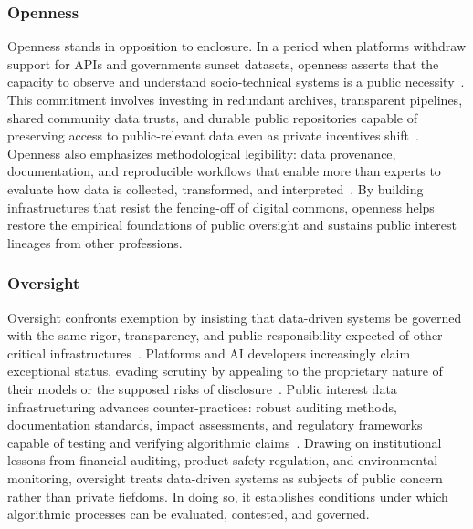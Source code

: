 \documentclass[acmsmall,screen]{acmart}
\begin{document}
\subsubsection*{Openness}
Openness stands in opposition to enclosure. In a period when platforms withdraw support for APIs and governments sunset datasets, openness asserts that the capacity to observe and understand socio-technical systems is a public necessity~\cite{Freelon_ComputationalResearchPostAPI_2018,Bruns_APIcalypsesocialmedia_2019}. This commitment involves investing in redundant archives, transparent pipelines, shared community data trusts, and durable public repositories capable of preserving access to public-relevant data even as private incentives shift~\cite{schwartz_archives_2002,acker_DataCraftTheory_2019}. Openness also emphasizes methodological legibility: data provenance, documentation, and reproducible workflows that enable more than experts to evaluate how data is collected, transformed, and interpreted~\cite{thomerRelationalDataParadigms2020,passiTrustDataScience2018a}. By building infrastructures that resist the fencing-off of digital commons, openness helps restore the empirical foundations of public oversight and sustains public interest lineages from other professions.

\subsubsection*{Oversight}
Oversight confronts exemption by insisting that data-driven systems be governed with the same rigor, transparency, and public responsibility expected of other critical infrastructures~\cite{pasquale_black_2016,hutchinsonAccountabilityMachineLearning2021}. Platforms and AI developers increasingly claim exceptional status, evading scrutiny by appealing to the proprietary nature of their models or the supposed risks of disclosure~\cite{suzor2018digital,obar2020biggest}. Public interest data infrastructuring advances counter-practices: robust auditing methods, documentation standards, impact assessments, and regulatory frameworks capable of testing and verifying algorithmic claims~\cite{hutchinsonAccountabilityMachineLearning2021,selbst2019fairness}. Drawing on institutional lessons from financial auditing, product safety regulation, and environmental monitoring, oversight treats data-driven systems as subjects of public concern rather than private fiefdoms. In doing so, it establishes conditions under which algorithmic processes can be evaluated, contested, and governed.
\end{document}
